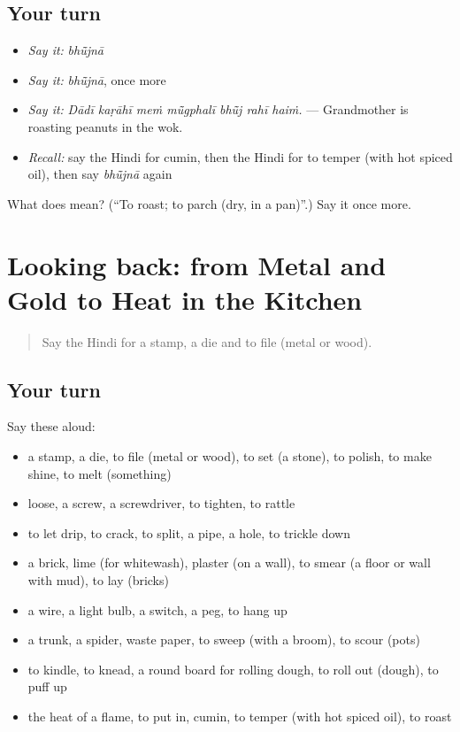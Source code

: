 \subsection*{Your turn}
\begin{itemize}
\raggedright
  \item \emph{Say it:} \emph{bhū̃jnā}
  \item \emph{Say it:} \emph{bhū̃jnā}, once more
  \item \emph{Say it:} \emph{Dādī kaṛāhī meṁ mū̃gphalī bhū̃j rahī haiṁ.} — Grandmother is roasting peanuts in the wok.
  \item \emph{Recall:} say the Hindi for cumin, then the Hindi for to temper (with hot spiced oil), then say \emph{bhū̃jnā} again
\end{itemize}

\begin{tcolorbox}[breakable,colback=teal!4,colframe=teal!35!black,title={Before you move on}]
What does  mean? (\textquotedblleft{}To roast; to parch (dry, in a pan)\textquotedblright{}.) Say it once more.
\end{tcolorbox}
\section[(dialogue)]{Looking back: from Metal and Gold to Heat in the Kitchen}

\label{lesson:HI-R521-review-514-521}



\begin{quote}
Say the Hindi for a stamp, a die and to file (metal or wood).
\end{quote}

\subsection*{Your turn}
Say these aloud:

\begin{itemize}
\raggedright
  \item a stamp, a die, to file (metal or wood), to set (a stone), to polish, to make shine, to melt (something)
  \item loose, a screw, a screwdriver, to tighten, to rattle
  \item to let drip, to crack, to split, a pipe, a hole, to trickle down
  \item a brick, lime (for whitewash), plaster (on a wall), to smear (a floor or wall with mud), to lay (bricks)
  \item a wire, a light bulb, a switch, a peg, to hang up
  \item a trunk, a spider, waste paper, to sweep (with a broom), to scour (pots)
  \item to kindle, to knead, a round board for rolling dough, to roll out (dough), to puff up
  \item the heat of a flame, to put in, cumin, to temper (with hot spiced oil), to roast
\end{itemize}

